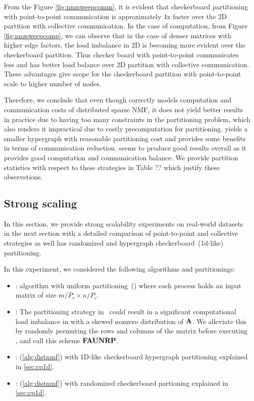From the Figure \ref{fig:nnzsweepcomm},  it is evident that checkerboard partitioning with point-to-point
communication is approximately 4x faster over the 2D partition with collective communication. In the case of
computation, from Figure \ref{fig:nnzsweepcomp}, we can observe that in the case of denser matrices
with higher edge factors, the load imbalance in 2D is becoming more evident over the checkerboard partition. 
Thus checker board with point-to-point communicates less and has better load balance over 2D partition
with collective communication. These advantages  give scope for the checkerboard partition with point-to-point scale
to higher number of nodes.

Therefore, we conclude that even though \krchb correctly models computation and communication costs of distributed sparse NMF, it does not yield better results in practice due to having too many constraints in the partitioning problem, which also renders it impractical due to costly precomputation for partitioning.
\krcha yields a smaller hypergraph with reasonable partitioning cost and provides some benefits in terms of communication reduction.
\krcr seems to produce good results overall as it provides good computation and communication balance.
We provide partition statistics with respect to these strategies in Table ?? which justify these observations.

\subsection {Strong scaling}
In this section, we provide strong scalability experiments on real-world datasets in the next section with a detailed comparison of point-to-point and collective strategies as well has randomized and hypergraph checkerboard~(1d-like) partitioning.

In this experiment, we considered the following algorithms and partitionings:
\begin{itemize}
	\item \unp: \mpifaun algorithm \cite{KBP16,KBP16MPIFAUN} with uniform partitioning~(\unp) where each process holds an input matrix of size $m/P_r \times n/P_c$. 
	\item \urp: The partitioning strategy in \unp\ could result in a significant computational load imbalance in with a skewed nonzero distribution of $\mathbf{A}$. We alleviate this by randomly permuting the rows and columns of the matrix before executing \mpifaun, and call this scheme $\textbf{FAUNRP}$.
	\item \cpp: \distspnmf (\cref{alg:distnmf}) with 1D-like checkerboard hypergraph partitioning explained in \cref{sec:cp1d}.
	\item \crp: \distspnmf (\cref{alg:distnmf}) with randomized checkerboard partioning explained in \cref{sec:cp1d}.
	
\end{itemize}

